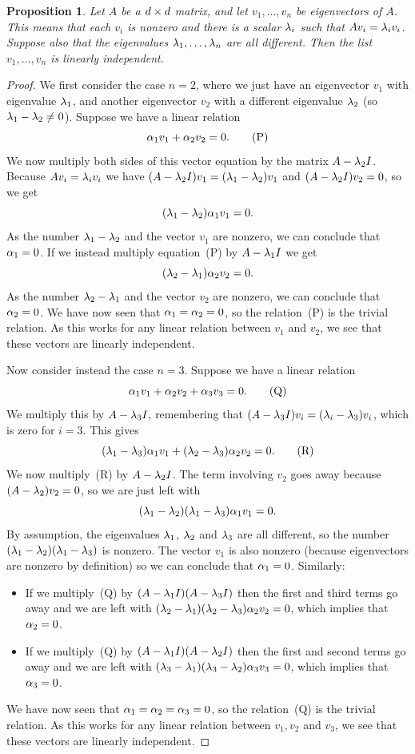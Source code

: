 \documentclass[reqno]{amsart}
\newtheorem{proposition}[theorem]{Proposition}
\theoremstyle{definition}
\begin{document}
\begin{proposition}\label{prop-independent-eigenvectors}
 Let $A$ be a $d\times d$ matrix, and let $v_1,\dotsc,v_n$ be
 eigenvectors of $A$.  This means that each $v_i$ is nonzero and there
 is a scalar $\lambda_i$ such that $Av_i=\lambda_iv_i$.  Suppose also that the
 eigenvalues $\lambda_1,\dotsc,\lambda_n$ are all different.  Then the list
 $v_1,\dotsc,v_n$ is linearly independent.
\end{proposition}
\begin{proof}
 We first consider the case $n=2$, where we just have an eigenvector
 $v_1$ with eigenvalue $\lambda_1$, and another eigenvector $v_2$ with
 a different eigenvalue $\lambda_2$ (so $\lambda_1-\lambda_2\neq 0$).  Suppose we
 have a linear relation
 \[ \alpha_1v_1 + \alpha_2v_2 = 0. \tag{P} \]
 We now multiply both sides of this vector equation by the matrix
 $A-\lambda_2I$.  Because $Av_i=\lambda_iv_i$ we have
 $(A-\lambda_2I)v_1=(\lambda_1-\lambda_2)v_1$ and $(A-\lambda_2I)v_2=0$, so we get
 \[ (\lambda_1-\lambda_2)\alpha_1 v_1 = 0. \]
 As the number $\lambda_1-\lambda_2$ and the vector $v_1$ are nonzero, we can
 conclude that $\alpha_1=0$.  If we instead multiply equation~(P) by
 $A-\lambda_1I$ we get
 \[ (\lambda_2-\lambda_1)\alpha_2v_2 = 0. \]
 As the number $\lambda_2-\lambda_1$ and the vector $v_2$ are nonzero, we can
 conclude that $\alpha_2=0$.  We have now seen that $\alpha_1=\alpha_2=0$, so
 the relation~(P) is the trivial relation.  As this works for any
 linear relation between $v_1$ and $v_2$, we see that these vectors
 are linearly independent.

 Now consider instead the case $n=3$.  Suppose we have a linear
 relation
 \[ \alpha_1v_1 + \alpha_2v_2 + \alpha_3v_3 = 0. \tag{Q} \]
 We multiply this by $A-\lambda_3I$, remembering that
 $(A-\lambda_3I)v_i=(\lambda_i-\lambda_3)v_i$, which is zero for $i=3$.  This
 gives
 \[ (\lambda_1-\lambda_3)\alpha_1v_1 + (\lambda_2-\lambda_3)\alpha_2v_2 = 0. \tag{R} \]
 We now multiply~(R) by $A-\lambda_2I$.  The term involving $v_2$ goes
 away because $(A-\lambda_2)v_2=0$, so we are just left with
 \[ (\lambda_1-\lambda_2)(\lambda_1-\lambda_3)\alpha_1v_1 = 0. \]
 By assumption, the eigenvalues $\lambda_1$, $\lambda_2$ and $\lambda_3$ are all
 different, so the number $(\lambda_1-\lambda_2)(\lambda_1-\lambda_3)$ is nonzero.
 The vector $v_1$ is also nonzero (because eigenvectors are nonzero by
 definition) so we can conclude that $\alpha_1=0$.  Similarly:
 \begin{itemize}
  \item If we multiply~(Q) by $(A-\lambda_1I)(A-\lambda_3I)$ then the first
   and third terms go away and we are left with
   $(\lambda_2-\lambda_1)(\lambda_2-\lambda_3)\alpha_2v_2=0$, which implies that
   $\alpha_2=0$.
  \item If we multiply~(Q) by $(A-\lambda_1I)(A-\lambda_2I)$ then the first
   and second terms go away and we are left with
   $(\lambda_3-\lambda_1)(\lambda_3-\lambda_2)\alpha_3v_3=0$, which implies that
   $\alpha_3=0$.
 \end{itemize}
 We have now seen that $\alpha_1=\alpha_2=\alpha_3=0$, so
 the relation~(Q) is the trivial relation.  As this works for any
 linear relation between $v_1,v_2$ and $v_3$, we see that these
 vectors are linearly independent.


\end{proof}
\end{document}
